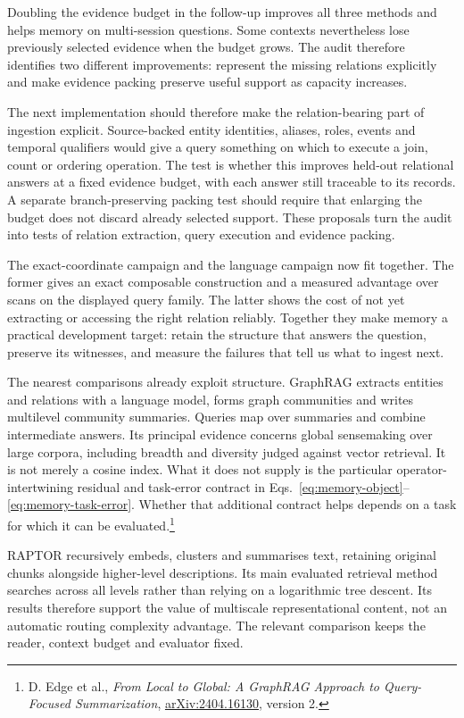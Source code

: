 Doubling the evidence budget in the follow-up improves all three methods and helps memory on multi-session questions. Some contexts nevertheless lose previously selected evidence when the budget grows. The audit therefore identifies two different improvements: represent the missing relations explicitly and make evidence packing preserve useful support as capacity increases.

The next implementation should therefore make the relation-bearing part of ingestion explicit. Source-backed entity identities, aliases, roles, events and temporal qualifiers would give a query something on which to execute a join, count or ordering operation. The test is whether this improves held-out relational answers at a fixed evidence budget, with each answer still traceable to its records. A separate branch-preserving packing test should require that enlarging the budget does not discard already selected support. These proposals turn the audit into tests of relation extraction, query execution and evidence packing.

The exact-coordinate campaign and the language campaign now fit together. The former gives an exact composable construction and a measured advantage over scans on the displayed query family. The latter shows the cost of not yet extracting or accessing the right relation reliably. Together they make memory a practical development target: retain the structure that answers the question, preserve its witnesses, and measure the failures that tell us what to ingest next.

The nearest comparisons already exploit structure. GraphRAG extracts entities and relations with a language model, forms graph communities and writes multilevel community summaries. Queries map over summaries and combine intermediate answers. Its principal evidence concerns global sensemaking over large corpora, including breadth and diversity judged against vector retrieval. It is not merely a cosine index. What it does not supply is the particular operator-intertwining residual and task-error contract in Eqs.~\eqref{eq:memory-object}--\eqref{eq:memory-task-error}. Whether that additional contract helps depends on a task for which it can be evaluated.\footnote{D. Edge et al., \emph{From Local to Global: A GraphRAG Approach to Query-Focused Summarization}, \href{https://arxiv.org/abs/2404.16130}{arXiv:2404.16130}, version 2.}~\cite{Edge202448436b}

RAPTOR recursively embeds, clusters and summarises text, retaining original chunks alongside higher-level descriptions. Its main evaluated retrieval method searches across all levels rather than relying on a logarithmic tree descent. Its results therefore support the value of multiscale representational content, not an automatic routing complexity advantage. The relevant comparison keeps the reader, context budget and evaluator fixed.~\cite{Sarthi2024a1f229}

